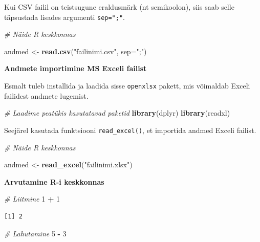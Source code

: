 \documentclass[
]{book}
\newenvironment{Shaded}{\begin{snugshade}}{\end{snugshade}}
\newcommand{\AttributeTok}[1]{\textcolor[rgb]{0.13,0.29,0.53}{#1}}
\newcommand{\CommentTok}[1]{\textcolor[rgb]{0.56,0.35,0.01}{\textit{#1}}}
\newcommand{\DecValTok}[1]{\textcolor[rgb]{0.00,0.00,0.81}{#1}}
\newcommand{\FunctionTok}[1]{\textcolor[rgb]{0.13,0.29,0.53}{\textbf{#1}}}
\newcommand{\NormalTok}[1]{#1}
\newcommand{\OtherTok}[1]{\textcolor[rgb]{0.56,0.35,0.01}{#1}}
\newcommand{\SpecialCharTok}[1]{\textcolor[rgb]{0.81,0.36,0.00}{\textbf{#1}}}
\newcommand{\StringTok}[1]{\textcolor[rgb]{0.31,0.60,0.02}{#1}}
\renewenvironment{Shaded} {\begin{snugshade}\footnotesize} {\end{snugshade}}
\theoremstyle{definition}
\theoremstyle{definition}
\theoremstyle{definition}
\theoremstyle{definition}
\theoremstyle{remark}
\begin{document}
Kui CSV failil on teistsugune eraldusmärk (nt semikoolon), siis saab selle täpsustada lisades argumenti \texttt{sep=";"}.

\begin{Shaded}
\begin{Highlighting}[]
\CommentTok{\# Näide R keskkonnas}

\NormalTok{andmed }\OtherTok{\textless{}{-}} \FunctionTok{read.csv}\NormalTok{(}\StringTok{"failinimi.csv"}\NormalTok{, }\AttributeTok{sep=}\StringTok{";"}\NormalTok{)}
\end{Highlighting}
\end{Shaded}

\textbf{Andmete importimine MS Exceli failist}

Esmalt tuleb installida ja laadida sisse \texttt{openxlsx} pakett, mis võimaldab Exceli failidest andmete lugemist.

\begin{Shaded}
\begin{Highlighting}[]
\CommentTok{\# Laadime peatükis kasutatavad paketid}
\FunctionTok{library}\NormalTok{(dplyr)}
\FunctionTok{library}\NormalTok{(readxl)}
\end{Highlighting}
\end{Shaded}

Seejärel kasutada funktsiooni \texttt{read\_excel()}, et importida andmed Exceli failist.

\begin{Shaded}
\begin{Highlighting}[]
\CommentTok{\# Näide R keskkonnas}

\NormalTok{andmed }\OtherTok{\textless{}{-}} \FunctionTok{read\_excel}\NormalTok{(}\StringTok{"failinimi.xlsx"}\NormalTok{)}
\end{Highlighting}
\end{Shaded}

\textbf{Arvutamine R-i keskkonnas}

\begin{Shaded}
\begin{Highlighting}[]
\CommentTok{\# Liitmine}
\DecValTok{1} \SpecialCharTok{+} \DecValTok{1}
\end{Highlighting}
\end{Shaded}

\begin{verbatim}
[1] 2
\end{verbatim}

\begin{Shaded}
\begin{Highlighting}[]
\CommentTok{\# Lahutamine}
\DecValTok{5} \SpecialCharTok{{-}} \DecValTok{3}
\end{Highlighting}
\end{Shaded}
\end{document}
